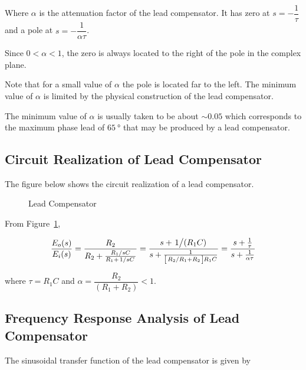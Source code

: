 \documentclass[
  14pt,
  a4paper,
  oneside,
  open=any,
  a4paper,
  14pt]{report}
\begin{document}
Where \(\alpha\) is the attenuation factor of the lead compensator. It
has zero at \(s = -\dfrac{1}{\tau}\) and a pole at
\(s=-\dfrac{1}{\alpha\tau}\).

Since \(0 < \alpha < 1\), the zero is always located to the right of the
pole in the complex plane.

Note that for a small value of \(\alpha\) the pole is located far to the
left. The minimum value of \(\alpha\) is limited by the physical
construction of the lead compensator.

The minimum value of \(\alpha\) is usually taken to be about
\(\sim 0.05\) which corresponds to the maximum phase lead of
\(\SI{65}{\degree}\) that may be produced by a lead compensator.

\newpage{}

\subsection{Circuit Realization of Lead
Compensator}\label{circuit-realization-of-lead-compensator}

The figure below shows the circuit realization of a lead compensator.

\begin{figure}

\centering{



}

\caption{\label{fig-lead-compensator}Lead Compensator}

\end{figure}%

From Figure~\ref{fig-lead-compensator},

\[
    \dfrac{E_o(s)}{E_i(s)} = \dfrac{R_2}{R_2 + \frac{\left.R_1\middle\slash sC\right.}{R_1+\left.1\middle\slash sC\right.}} = \dfrac{s+\left.1\middle\slash(R_1C)\right.}{s+\frac{1}{\left[\left.R_2\middle\slash R_1+R_2\right.\right]R_1C}} = \dfrac{s+\frac{1}{\tau}}{s+\frac{1}{\alpha \tau}}
\]

where \(\tau = R_1C\) and \(\alpha = \dfrac{R_2}{(R_1+R_2)} < 1\).

\subsection{Frequency Response Analysis of Lead
Compensator}\label{frequency-response-analysis-of-lead-compensator}

The sinusoidal transfer function of the lead compensator is given by
\end{document}
